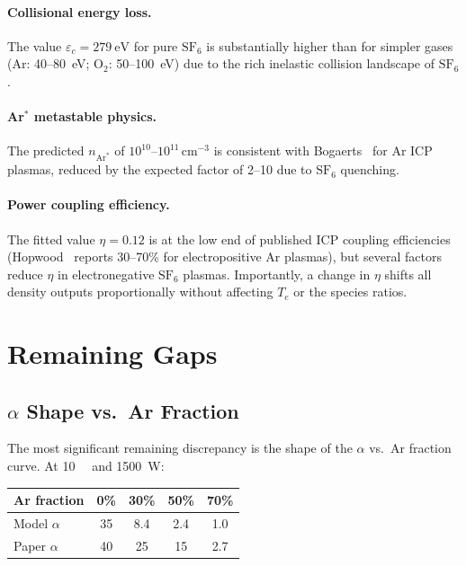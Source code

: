 \documentclass[11pt,a4paper]{report}
\newcommand{\SFsix}{\mathrm{SF}_6}
\newcommand{\Ar}{\mathrm{Ar}}
\newcommand{\Te}{T_e}
\begin{document}
\paragraph{Collisional energy loss.}  The value $\varepsilon_c = \SI{279}{\electronvolt}$ for pure $\SFsix$ is substantially higher than for simpler gases (Ar: 40--\SI{80}{\electronvolt}; O$_2$: 50--\SI{100}{\electronvolt}) due to the rich inelastic collision landscape of $\SFsix$.

\paragraph{Ar$^*$ metastable physics.}  The predicted $n_{\Ar^*}$ of $10^{10}$--$10^{11}$\,cm$^{-3}$ is consistent with Bogaerts~\cite{Bogaerts2009} for Ar ICP plasmas, reduced by the expected factor of 2--10 due to $\SFsix$ quenching.

\paragraph{Power coupling efficiency.}  The fitted value $\eta = 0.12$ is at the low end of published ICP coupling efficiencies (Hopwood~\cite{Hopwood1992} reports 30--70\% for electropositive Ar plasmas), but several factors reduce $\eta$ in electronegative $\SFsix$ plasmas.  Importantly, a change in $\eta$ shifts all density outputs proportionally without affecting $\Te$ or the species ratios.

\section{Remaining Gaps}
\label{sec:gasphase_remaining}

\subsection{$\alpha$ Shape vs.\ Ar Fraction}
\label{sec:gasphase_alpha_shape}

The most significant remaining discrepancy is the shape of the $\alpha$ vs.\ Ar fraction curve.  At \SI{10}{\milli\torr} and \SI{1500}{\watt}:

\begin{center}
\small
\begin{tabular}{lcccc}
\toprule
Ar fraction & 0\% & 30\% & 50\% & 70\% \\
\midrule
Model $\alpha$ & 35 & 8.4 & 2.4 & 1.0 \\
Paper $\alpha$ & 40 & 25 & 15 & 2.7 \\
\bottomrule
\end{tabular}
\end{center}
\end{document}
